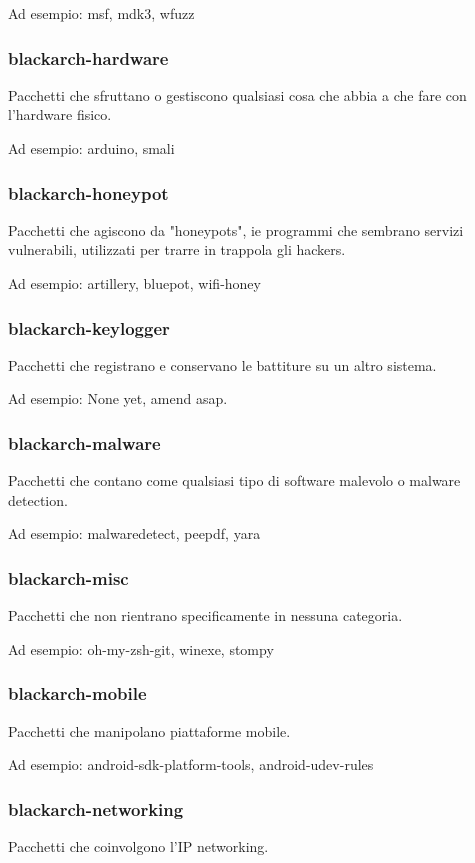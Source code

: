 \documentclass[a4paper, oneside, 11pt]{book}
\begin{document}
Ad esempio: msf, mdk3, wfuzz

\subsubsection{blackarch-hardware}
Pacchetti che sfruttano o gestiscono qualsiasi cosa che abbia a che fare con l'hardware fisico.

Ad esempio: arduino, smali

\subsubsection{blackarch-honeypot}
Pacchetti che agiscono da "honeypots", ie programmi che sembrano servizi vulnerabili, utilizzati per trarre in trappola gli hackers.

Ad esempio: artillery, bluepot, wifi-honey

\subsubsection{blackarch-keylogger}
Pacchetti che registrano e conservano le battiture su un altro sistema.

Ad esempio: None yet, amend asap.

\subsubsection{blackarch-malware}
Pacchetti che contano come qualsiasi tipo di software malevolo o malware detection.

Ad esempio: malwaredetect, peepdf, yara

\subsubsection{blackarch-misc}
Pacchetti che non rientrano specificamente in nessuna categoria.

Ad esempio: oh-my-zsh-git, winexe, stompy

\subsubsection{blackarch-mobile}
Pacchetti che manipolano piattaforme mobile.

Ad esempio: android-sdk-platform-tools, android-udev-rules

\subsubsection{blackarch-networking}
Pacchetti che coinvolgono l'IP networking.
\end{document}
